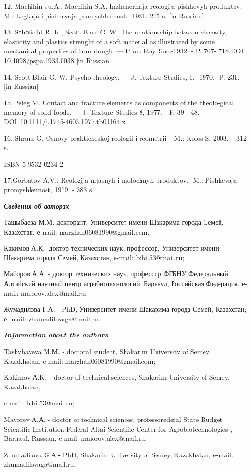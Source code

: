 12. Machihin Ju.A., Machihin S.A. Inzhenernaja reologija pishhevyh
produktov. - M.: Legkaja i pishhevaja promyshlennost\textquotesingle.-
1981.-215 s. {[}in Russian{]}

13. Sсhоfie1d R. K., Scott Blair G. W. The relationschip between
viscosity, elasticity and plastics strenght of a soft material as
illustrated by some mechanical properties of flour dough. --- Proc. Roy.
Soc.-1932. - P. 707- 718.DOI 10.1098/pspa.1933.0038 {[}in Russian{]}

14. Scott Blair G. W. Psycho-rheology. --- J. Texture Studies, 1.-
1970.- P. 231. {[}in Russian{]}

15. Реleg M. Contact and fracture elements as components of the
rheolo-gical memory of solid foods. --- J. Texture Studies 8, 1977. - P.
39 - 48. DOI~10.1111/j.1745-4603.1977.tb01164.x

16. Shram G. Osnovy prakticheskoj reologii i reometrii -- M.: Kolos S,
2003. -- 312 s.

ISBN 5-9532-0234-2

17.Gorbatov A.V., Reologija mjasnyh i molochnyh produktov. -M.:
Pishhevaja promyshlennost\textquotesingle, 1979. - 383 s.

\emph{{\bfseries Сведения об авторах}}

Ташыбаева М.М.-докторант, Университет имени Шакарима города Семей,
Казахстан, е-mail: marzhan06081990@gmail.com.

Какимов А.К.- доктор технических наук, профессор, Университет имени
Шакарима города Семей, Казахстан, е-mail: bibi.53@mail.ru;

Майоров А.А. - доктор технических наук, профессор ФГБНУ Федеральный
Алтайский научный центр агробиотехнологий, Барнаул, Российская
Федерация, е-mail: maiorov.alex@mail.ru;

Жумадилова Г.А. - PhD, Университет имени Шакарима города Семей,
Казахстан; е- mail: zhumadilovaga@mail.ru.

\emph{{\bfseries Information about the authors}}

Tashybayeva M.М{\bfseries .} - doctoral student, Shakarim University of
Semey, Kazakhstan, e-mail: marzhan06081990@gmail.com;

Kakimov А.К. -- doctor of technical sciences, Shakarim University of
Semey, Kazakhstan,

e-mail: bibi.53@mail.ru;

Mayorov A.А. - doctor of technical sciences, professorederal State
Budget Scientific Institution Federal Altai Scientific Center for
Agrobiotechnologies , Barnaul, Russian, e-mail: maiorov.alex@mail.ru;

Zhumadilova G.А.{\bfseries -} PhD, Shakarim University of Semey,
Kazakhstan; e-mail: zhumadilovaga@mail.ru.



